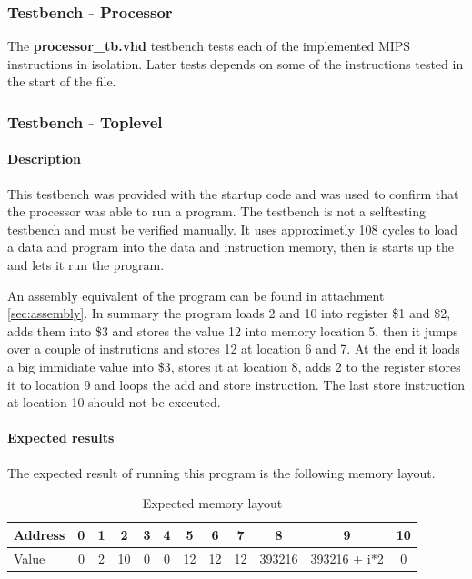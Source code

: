 \subsubsection{Testbench - Processor}
The {\bf processor\_tb.vhd} testbench tests each of the implemented MIPS instructions in isolation. Later tests depends on some of the instructions tested in the start of the file.
\subsubsection{Testbench - Toplevel}

\paragraph{Description}

This testbench was provided with the startup code and was used to confirm that the processor was able to run a program. The testbench is not a selftesting testbench and must be verified manually. It uses approximetly 108 cycles to load a data and program into the data and instruction memory, then is starts up the and lets it run the program.

An assembly equivalent of the program can be found in attachment \ref{sec:assembly}.
In summary the program loads 2 and 10 into register \$1 and \$2, adds them into \$3 and stores the value 12 into memory location 5, then it jumps over a couple of instrutions and stores 12 at location 6 and 7. At the end it loads a big immidiate value into \$3, stores it at location 8, adds 2 to the register stores it to location 9 and loops the add and store instruction. The last store instruction at location 10 should not be executed.

\paragraph{Expected results}
\label{sec:exp_res}
The expected result of running this program is the following memory layout. 
\begin{table}[h]

	\begin{tabular}{|l|c|c|c|c|c|c|c|c|c|c|c|}
		\hline
		Address &  0 &  1 &  2 &  3 &  4 &  5 &  6 &  7 &  8 &  9 & 10 \\
		\hline
		Value   &  0 &  2 & 10 &  0 & 0 & 12  & 12 & 12 & 393216 & 393216 + i*2 & 0\\
		\hline
	\end{tabular}
	\caption{Expected memory layout}
	\label{table:exp_res}
\end{table}

